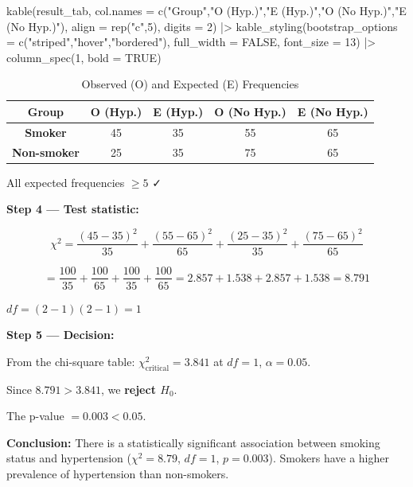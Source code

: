 \documentclass[
  12pt,
  letterpaper,
]{book}
\newenvironment{Shaded}{\begin{snugshade}}{\end{snugshade}}
\newcommand{\AttributeTok}[1]{\textcolor[rgb]{0.40,0.45,0.13}{#1}}
\newcommand{\ConstantTok}[1]{\textcolor[rgb]{0.56,0.35,0.01}{#1}}
\newcommand{\DecValTok}[1]{\textcolor[rgb]{0.68,0.00,0.00}{#1}}
\newcommand{\FunctionTok}[1]{\textcolor[rgb]{0.28,0.35,0.67}{#1}}
\newcommand{\NormalTok}[1]{\textcolor[rgb]{0.00,0.23,0.31}{#1}}
\newcommand{\SpecialCharTok}[1]{\textcolor[rgb]{0.37,0.37,0.37}{#1}}
\newcommand{\StringTok}[1]{\textcolor[rgb]{0.13,0.47,0.30}{#1}}
\begin{document}
\begin{tcolorbox}
\begin{Shaded}
\begin{Highlighting}[]
\FunctionTok{kable}\NormalTok{(result\_tab,}
      \AttributeTok{col.names =} \FunctionTok{c}\NormalTok{(}\StringTok{"Group"}\NormalTok{,}\StringTok{"O (Hyp.)"}\NormalTok{,}\StringTok{"E (Hyp.)"}\NormalTok{,}\StringTok{"O (No Hyp.)"}\NormalTok{,}\StringTok{"E (No Hyp.)"}\NormalTok{),}
      \AttributeTok{align =} \FunctionTok{rep}\NormalTok{(}\StringTok{"c"}\NormalTok{,}\DecValTok{5}\NormalTok{), }\AttributeTok{digits =} \DecValTok{2}\NormalTok{) }\SpecialCharTok{|\textgreater{}}
  \FunctionTok{kable\_styling}\NormalTok{(}\AttributeTok{bootstrap\_options =} \FunctionTok{c}\NormalTok{(}\StringTok{"striped"}\NormalTok{,}\StringTok{"hover"}\NormalTok{,}\StringTok{"bordered"}\NormalTok{),}
                \AttributeTok{full\_width =} \ConstantTok{FALSE}\NormalTok{, }\AttributeTok{font\_size =} \DecValTok{13}\NormalTok{) }\SpecialCharTok{|\textgreater{}}
  \FunctionTok{column\_spec}\NormalTok{(}\DecValTok{1}\NormalTok{, }\AttributeTok{bold =} \ConstantTok{TRUE}\NormalTok{)}
\end{Highlighting}
\end{Shaded}

\begingroup\fontsize{13}{15}\selectfont

\begin{longtable}[t]{>{}ccccc}

\caption{\label{tbl-expected}Observed (O) and Expected (E) Frequencies}

\tabularnewline

\toprule
Group & O (Hyp.) & E (Hyp.) & O (No Hyp.) & E (No Hyp.)\\
\midrule
\textbf{Smoker} & 45 & 35 & 55 & 65\\
\textbf{Non-smoker} & 25 & 35 & 75 & 65\\
\bottomrule

\end{longtable}

\endgroup{}

All expected frequencies \(\geq 5\) ✓

\textbf{Step 4 --- Test statistic:}

\[\chi^2 = \frac{(45-35)^2}{35} + \frac{(55-65)^2}{65} +
           \frac{(25-35)^2}{35} + \frac{(75-65)^2}{65}\]

\[= \frac{100}{35} + \frac{100}{65} + \frac{100}{35} + \frac{100}{65}
= 2.857 + 1.538 + 2.857 + 1.538 = \mathbf{8.791}\]

\(df = (2-1)(2-1) = 1\)

\textbf{Step 5 --- Decision:}

From the chi-square table: \(\chi^2_{\text{critical}} = 3.841\) at
\(df=1\), \(\alpha=0.05\).

Since \(8.791 > 3.841\), we \textbf{reject \(H_0\)}.

The p-value \(= 0.003 < 0.05\).

\textbf{Conclusion:} There is a statistically significant association
between smoking status and hypertension (\(\chi^2 = 8.79\), \(df = 1\),
\(p = 0.003\)). Smokers have a higher prevalence of hypertension than
non-smokers.

\end{tcolorbox}
\end{document}
